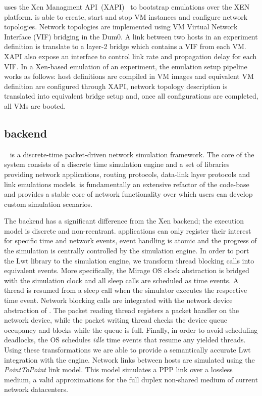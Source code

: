 \sdnsim uses the Xen Managment API~(XAPI)~\cite{xapi} to bootstrap emulations over
the XEN platform.  \sdnsim is able to create, start and stop VM instances and
configure network topologies.  Network topologies are implemented using  VM Virtual
Network Interface (VIF) bridging in the Dum0. A link between two hosts in an
experiment definition is translate to a layer-2 bridge which contains a VIF from
each VM\@.  XAPI also expose an interface to control link rate and propagation
delay for each VIF\@. In a Xen-based emulation of an \sdnsim experiment, the
emulation setup pipeline works as follows: host definitions are compiled in VM
images and equivalent VM definition are configured through XAPI, network
topology description is translated into equivalent bridge setup and, once all
configurations are completed, all VMs are booted.

\subsection{ backend}

~\cite{Henderson2006} is a discrete-time packet-driven network simulation
framework. The core of the system consists of a discrete time simulation engine
and a set of  libraries providing network
applications, routing protocols, data-link layer protocols and link emulations
models.  is fundamentally an extensive refactor of the  code-base
and provides a stable core of network functionality over which users can develop
custom simulation scenarios. 

The  backend has a significant difference from the Xen backend; the
execution model is discrete and non-reentrant.  applications can only
register their interest for specific time and network events, event handling is
atomic and the progress of the simulation is centrally controlled by the
simulation engine. In order to port the Lwt library to the  simulation
engine, we transform thread blocking calls into equivalent  events.  More
specifically, the Mirage OS clock abstraction is bridged with the  simulation
clock and all sleep calls are scheduled as  time events.  A thread is
resumed from a sleep call when the simulator executes the respective time event.
Network blocking calls are integrated with the network device abstraction of
.  The packet reading thread registers a packet handler on the network
device, while the packet writing thread checks the device queue occupancy and
blocks while the queue is full. Finally, in order to avoid scheduling deadlocks,
the OS schedules {\it idle} \/time events that resume any yielded threads. Using
these transformations we are able to provide a semantically accurate Lwt
integration with the  engine.  Network links between hosts are simulated
using the {\it PointToPoint} \/link model. This model simulates a PPP link over a
lossless medium, a valid approximations for the full duplex non-shared medium of
current network datacenters.

